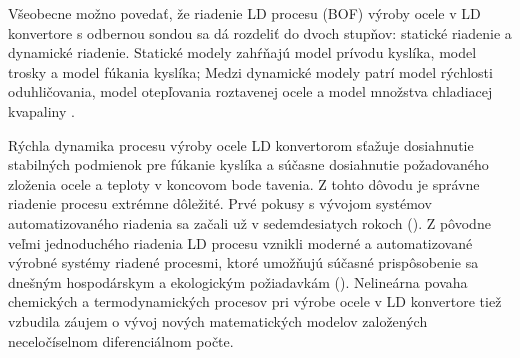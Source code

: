 \documentclass[]{tukediphc}
\begin{document}

Všeobecne možno povedať, že riadenie LD procesu (BOF) výroby ocele v LD konvertore s odbernou sondou sa dá rozdeliť do dvoch stupňov: statické riadenie a dynamické riadenie. Statické modely zahŕňajú model prívodu kyslíka, model trosky a model fúkania kyslíka; Medzi dynamické modely patrí model rýchlosti oduhličovania, model otepľovania roztavenej ocele a model množstva chladiacej kvapaliny \cite{Wang2010}.


Rýchla dynamika procesu výroby ocele LD konvertorom sťažuje dosiahnutie stabilných podmienok pre fúkanie kyslíka a súčasne dosiahnutie požadovaného zloženia ocele a teploty v koncovom bode tavenia. Z tohto dôvodu je správne riadenie procesu extrémne dôležité. Prvé pokusy s vývojom systémov automatizovaného riadenia sa začali už v sedemdesiatych rokoch (\cite{Fritz2005}). Z pôvodne veľmi jednoduchého riadenia LD procesu vznikli moderné a automatizované výrobné systémy riadené procesmi, ktoré umožňujú súčasné prispôsobenie sa dnešným hospodárskym a ekologickým požiadavkám (\cite{Sarkar2015}). Nelineárna povaha chemických a termodynamických procesov pri výrobe ocele v LD konvertore tiež vzbudila záujem o vývoj nových matematických modelov založených neceločíselnom diferenciálnom počte.

\end{document}
